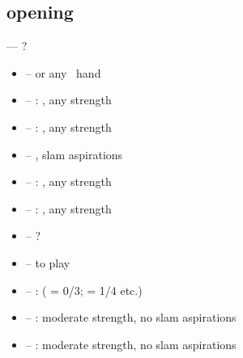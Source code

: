 \subsection{ opening}
\label{subsec:1nt-op}

 --- ?
\begin{itemize}
  \item {} -- \hyperref[subsec:stayman]{}  or any \inv\ hand
  \item {} -- : , any strength
  \item {} -- : , any strength
  \item {} -- \hyperref[subsec:minor-stayman]{} , slam aspirations
  \item {} -- : , any strength
  \item {} -- : , any strength
  \item {} -- ?
  \item {} -- \nat\/ to play
  \item {} -- :  ( = 0/3;  = 1/4 etc.)
  \item {} -- :  moderate strength, no slam aspirations
  \item {} -- :  moderate strength, no slam aspirations
\end{itemize}
